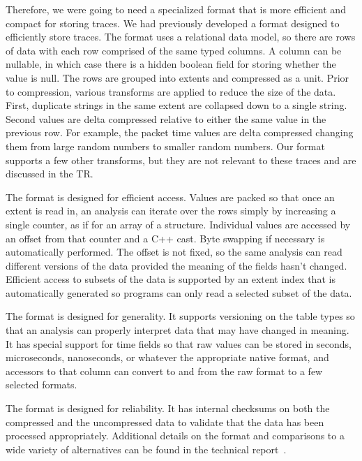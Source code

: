 Therefore, we were going to need a specialized format that is more
efficient and compact for storing traces.  We had previously developed
a format designed to efficiently store traces.  The format uses a
relational data model, so there are rows of data with each row
comprised of the same typed columns.  A column can be nullable, in
which case there is a hidden boolean field for storing whether the
value is null.  The rows are grouped into extents and compressed as a
unit.  Prior to compression, various transforms are applied to reduce
the size of the data.  First, duplicate strings in the same extent are
collapsed down to a single string.  Second values are delta compressed
relative to either the same value in the previous row.  For example,
the packet time values are delta compressed changing them from large
random numbers to smaller random numbers.  Our format supports a few
other transforms, but they are not relevant to these traces and are
discussed in the TR.

The format is designed for efficient access. Values are packed so that
once an extent is read in, an analysis can iterate over the rows
simply by increasing a single counter, as if for an array of a
structure.  Individual values are accessed by an offset from that
counter and a C++ cast.  Byte swapping if necessary is automatically
performed.  The offset is not fixed, so the same analysis can read
different versions of the data provided the meaning of the fields
hasn't changed.  Efficient access to subsets of the data is supported
by an extent index that is automatically generated so programs can
only read a selected subset of the data.

The format is designed for generality. It supports versioning on the
table types so that an analysis can properly interpret data that may
have changed in meaning.  It has special support for time fields so
that raw values can be stored in seconds, microseconds, nanoseconds,
or whatever the appropriate native format, and accessors to that column
can convert to and from the raw format to a few selected formats.

The format is designed for reliability.  It has internal checksums on
both the compressed and the uncompressed data to validate that the
data has been processed appropriately.  Additional details on the
format and comparisons to a wide variety of alternatives can be found
in the technical report~\cite{DSTechnicalReportSnapshot}.
